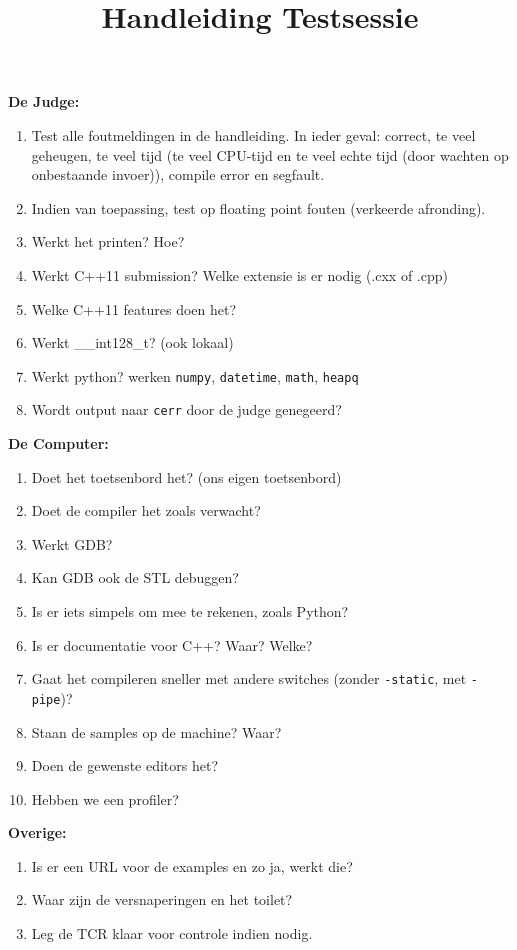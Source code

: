 \documentclass[10pt,a4paper]{article}
\title{Handleiding Testsessie}
\author{}
\begin{document}
\maketitle

\noindent\textbf{De Judge:}

\begin{enumerate}
\item Test alle foutmeldingen in de handleiding. In ieder geval: correct, te veel geheugen, te veel tijd (te veel CPU-tijd en te veel echte tijd (door wachten op onbestaande invoer)), compile error en segfault.
\item Indien van toepassing, test op floating point fouten (verkeerde afronding).
\item Werkt het printen? Hoe?
\item Werkt C++11 submission? Welke extensie is er nodig (.cxx of .cpp)
\item Welke C++11 features doen het?
\item Werkt \_\_int128\_t? (ook lokaal)
\item Werkt python? werken \texttt{numpy}, \texttt{datetime}, \texttt{math}, \texttt{heapq}
\item Wordt output naar \texttt{cerr} door de judge genegeerd?
\end{enumerate}

\noindent\textbf{De Computer:}

\begin{enumerate}
\item Doet het toetsenbord het? (ons eigen toetsenbord)
\item Doet de compiler het zoals verwacht?
\item Werkt GDB?
\item Kan GDB ook de STL debuggen?
\item Is er iets simpels om mee te rekenen, zoals Python?
\item Is er documentatie voor C++? Waar? Welke?
\item Gaat het compileren sneller met andere switches (zonder \verb|-static|, met \verb|-pipe|)?
\item Staan de samples op de machine? Waar?
\item Doen de gewenste editors het?
\item Hebben we een profiler?
\end{enumerate}

\noindent\textbf{Overige:}

\begin{enumerate}
\item Is er een URL voor de examples en zo ja, werkt die?
\item Waar zijn de versnaperingen en het toilet?
\item Leg de TCR klaar voor controle indien nodig.
\end{enumerate}
\end{document}
